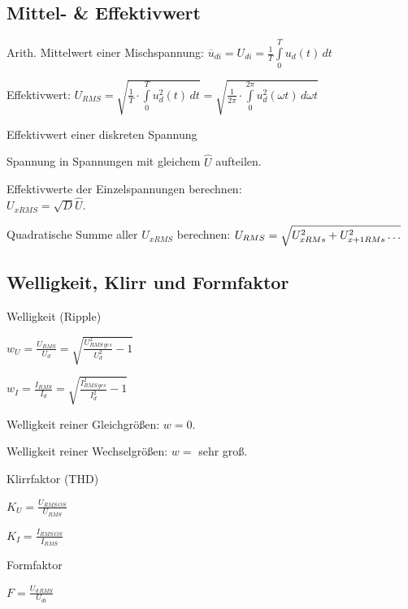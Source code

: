 \documentclass[german]{latex4ei/latex4ei_sheet}
\begin{document}
	\subsection{Mittel- \& Effektivwert}
	\begin{sectionbox}
		\begin{symbolbox}
			\item Arith. Mittelwert einer Mischspannung: $\overline{u}_{di} = U_{di} = \frac{1}{T}\int\limits_0^T u_d(t)\,dt$
			\item Effektivwert: $U_{RMS} = \sqrt{\frac{1}{T}\cdot \int\limits_0^T u^2_d(t)\,dt}= \sqrt{\frac{1}{2\pi}\cdot \int\limits_0^{2\pi} u^2_d(\omega t)\,d\omega t}$
		\end{symbolbox}
		\begin{cookbox}{Effektivwert einer diskreten Spannung}
			\item Spannung in Spannungen mit gleichem $\hat{U}$ aufteilen.
			\item Effektivwerte der Einzelspannungen berechnen:\\ $U_{xRMS} = \sqrt{D} \hat{U}$.
			\item Quadratische Summe aller $U_{xRMS}$ berechnen: $\\ U_{RMS} = \sqrt{U_{xRMs}^2+U_{x+1RMs}^2\dots}$
		\end{cookbox}
	\subsection{Welligkeit, Klirr und Formfaktor}
		\begin{symbolbox}{Welligkeit (Ripple)}
			\item $w_U = \frac{U_{RMS}}{U_d} = \sqrt{\frac{U_{RMS\,ges}^2}{U_d^2}-1}$
			\item $w_I = \frac{I_{RMS}}{I_d} = \sqrt{\frac{I_{RMS\,ges}^2}{I_d^2}-1}$
			\item Welligkeit reiner Gleichgrößen: $w = 0$.
			\item Welligkeit reiner Wechselgrößen: $w =$ sehr groß.
		\end{symbolbox}
		\begin{bluebox}{Klirrfaktor (THD)}
			\item $K_U =   \frac{U_{RMS\, OS}}{U_{RMS}}$
			\item $K_I =   \frac{I_{RMS\, OS}}{I_{RMS}}$
		\end{bluebox}

		\begin{symbolbox}{Formfaktor}
			\item $F = \frac{U_{d\,RMS}}{U_{di}}$
		\end{symbolbox}
	\end{sectionbox}
	\vspace{3cm}
\end{document}
